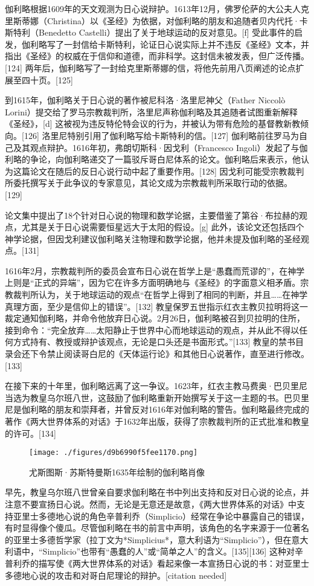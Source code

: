 伽利略根据1609年的天文观测为日心说辩护。1613年12月，佛罗伦萨的大公夫人克里斯蒂娜（Christina）以《圣经》为依据，对伽利略的朋友和追随者贝内代托·卡斯特利（Benedetto Castelli）提出了关于地球运动的反对意见。[f] 受此事件的启发，伽利略写了一封信给卡斯特利，论证日心说实际上并不违反《圣经》文本，并指出《圣经》的权威在于信仰和道德，而非科学。这封信未被发表，但广泛传播。[124] 两年后，伽利略写了一封给克里斯蒂娜的信，将他先前用八页阐述的论点扩展至四十页。[125]  

到1615年，伽利略关于日心说的著作被尼科洛·洛里尼神父（Father Niccolò Lorini）提交给了罗马宗教裁判所，洛里尼声称伽利略及其追随者试图重新解释《圣经》，[d] 这被视为违反特伦特会议的行为，并被认为带有危险的基督教新教倾向。[126] 洛里尼特别引用了伽利略写给卡斯特利的信。[127] 伽利略前往罗马为自己及其观点辩护。1616年初，弗朗切斯科·因戈利（Francesco Ingoli）发起了与伽利略的争论，向伽利略递交了一篇驳斥哥白尼体系的论文。伽利略后来表示，他认为这篇论文在随后的反日心说行动中起了重要作用。[128] 因戈利可能受宗教裁判所委托撰写关于此争议的专家意见，其论文成为宗教裁判所采取行动的依据。[129]  

论文集中提出了18个针对日心说的物理和数学论据，主要借鉴了第谷·布拉赫的观点，尤其是关于日心说需要恒星远大于太阳的假设。[g] 此外，该论文还包括四个神学论据，但因戈利建议伽利略关注物理和数学论据，他并未提及伽利略的圣经观点。[131]

1616年2月，宗教裁判所的委员会宣布日心说在哲学上是“愚蠢而荒谬的”，在神学上则是“正式的异端”，因为它在许多方面明确地与《圣经》的字面意义相矛盾。宗教裁判所认为，关于地球运动的观点“在哲学上得到了相同的判断，并且……在神学真理方面，至少是信仰上的错误”。[132] 教皇保罗五世指示红衣主教贝拉明将这一裁定通知伽利略，并命令他放弃日心说。2月26日，伽利略被召到贝拉明的住所，接到命令：“完全放弃……太阳静止于世界中心而地球运动的观点，并从此不得以任何方式持有、教授或辩护该观点，无论是口头还是书面形式。”[133] 教皇的禁书目录会还下令禁止阅读哥白尼的《天体运行论》和其他日心说著作，直至进行修改。[133]  

在接下来的十年里，伽利略远离了这一争议。1623年，红衣主教马费奥·巴贝里尼当选为教皇乌尔班八世，这鼓励了伽利略重新开始撰写关于这一主题的书。巴贝里尼是伽利略的朋友和崇拜者，并曾反对1616年对伽利略的警告。伽利略最终完成的著作《两大世界体系的对话》于1632年出版，获得了宗教裁判所的正式批准和教皇的许可。[134]
\begin{figure}[ht]
\centering
\texttt{[image: ./figures/d9b6990f5fee1170.png]}
\caption{尤斯图斯·苏斯特曼斯1635年绘制的伽利略肖像} \label{fig_JLL_9}
\end{figure}
早先，教皇乌尔班八世曾亲自要求伽利略在书中列出支持和反对日心说的论点，并注意不要宣扬日心说。然而，无论是无意还是故意，《两大世界体系的对话》中支持亚里士多德地心说的角色辛普利乔（Simplicio）经常在争论中暴露自己的错误，有时显得像个傻瓜。尽管伽利略在书的前言中声明，该角色的名字来源于一位著名的亚里士多德哲学家（拉丁文为*Simplicius*，意大利语为“Simplicio”），但在意大利语中，“Simplicio”也带有“愚蠢的人”或“简单之人”的含义。[135][136] 这种对辛普利乔的描写使《两大世界体系的对话》看起来像一本宣扬日心说的书：对亚里士多德地心说的攻击和对哥白尼理论的辩护。[citation needed]  

